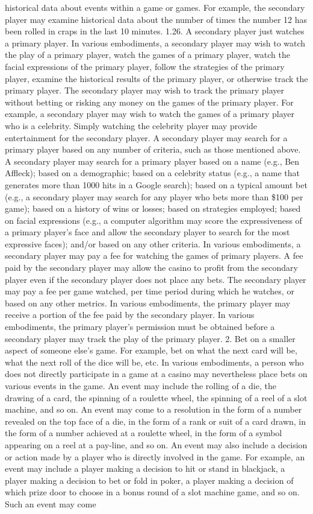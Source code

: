 \documentclass[11pt,a4paper]{article}
\begin{document}
historical data about events within a game or games. For example, the secondary player may examine historical data about the number of times the number 12 has been rolled in craps in the last 10 minutes. 1.26. A secondary player just watches a primary player. In various embodiments, a secondary player may wish to watch the play of a primary player, watch the games of a primary player, watch the facial expressions of the primary player, follow the strategies of the primary player, examine the historical results of the primary player, or otherwise track the primary player. The secondary player may wish to track the primary player without betting or risking any money on the games of the primary player. For example, a secondary player may wish to watch the games of a primary player who is a celebrity. Simply watching the celebrity player may provide entertainment for the secondary player. A secondary player may search for a primary player based on any number of criteria, such as those mentioned above. A secondary player may search for a primary player based on a name (e.g., Ben Affleck); based on a demographic; based on a celebrity status (e.g., a name that generates more than 1000 hits in a Google search); based on a typical amount bet (e.g., a secondary player may search for any player who bets more than \$100 per game); based on a history of wins or losses; based on strategies employed; based on facial expressions (e.g., a computer algorithm may score the expressiveness of a primary player's face and allow the secondary player to search for the most expressive faces); and/or based on any other criteria. In various embodiments, a secondary player may pay a fee for watching the games of primary players. A fee paid by the secondary player may allow the casino to profit from the secondary player even if the secondary player does not place any bets. The secondary player may pay a fee per game watched, per time period during which he watches, or based on any other metrics. In various embodiments, the primary player may receive a portion of the fee paid by the secondary player. In various embodiments, the primary player's permission must be obtained before a secondary player may track the play of the primary player. 2. Bet on a smaller aspect of someone else's game. For example, bet on what the next card will be, what the next roll of the dice will be, etc. In various embodiments, a person who does not directly participate in a game at a casino may nevertheless place bets on various events in the game. An event may include the rolling of a die, the drawing of a card, the spinning of a roulette wheel, the spinning of a reel of a slot machine, and so on. An event may come to a resolution in the form of a number revealed on the top face of a die, in the form of a rank or suit of a card drawn, in the form of a number achieved at a roulette wheel, in the form of a symbol appearing on a reel at a pay-line, and so on. An event may also include a decision or action made by a player who is directly involved in the game. For example, an event may include a player making a decision to hit or stand in blackjack, a player making a decision to bet or fold in poker, a player making a decision of which prize door to choose in a bonus round of a slot machine game, and so on. Such an event may come 
\end{document}
